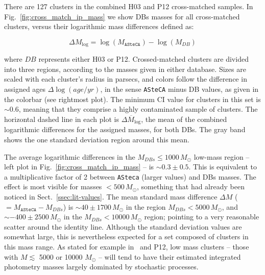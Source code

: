 \documentclass{aa}
\begin{document}
There are 127 clusters in the combined H03 and P12 cross-matched samples.
In Fig.~\ref{fig:cross_match_ip_mass} we show DBs masses for all cross-matched
clusters, versus their logarithmic mass differences defined as:

\begin{equation}
\Delta M_{\log} = \log(M_{\mathtt{ASteCA}}) - \log(M_{DB})
\label{eq:log_mass_diffs}
\end{equation}

\noindent where $DB$ represents either H03 or P12. Crossed-matched clusters are
divided into three regions, according to the masses given in either database.
%
Sizes are scaled with each cluster's radius in parsecs, and colors follow the
difference in assigned ages $\Delta \log(age/yr)$, in the sense \texttt{ASteCA}
minus DB values, as given in the colorbar (see rightmost plot).
The minimum CI value for clusters in this set is ${\sim}0.6$, meaning that they
comprise a highly contaminated sample of clusters.
The horizontal dashed line in each plot is $\overline{\Delta M_{\log}}$, the
mean of the combined logarithmic differences for the assigned masses, for both
DBs. The gray band shows the one standard deviation region around this mean.

The average logarithmic differences in the $M_{DBs}{\le}1000\,M_{\odot}$
low-mass region -- left plot in Fig.~\ref{fig:cross_match_ip_mass} -- is
${\sim}0.3\pm0.5$. This is equivalent to a multiplicative factor of 2 between
\texttt{ASteca} (larger values) and DBs masses. The effect is most visible for
masses ${<}500\,M_{\odot}$, something that had already been noticed in
Sect.~\ref{ssec:lit-values}.
%
The mean standard mass difference $\Delta M$ (${=}M_{\mathtt{ASteCA}}-M_{DBs}$)
is ${\sim}40{\pm}1700\,M_{\odot}$ in the region $M_{DBs} {<}5000\,M_{\odot}$,
and ${\sim-}400{\pm}2500\,M_{\odot}$ in the $M_{DBs} {<}10000\,M_{\odot}$
region; pointing to a very reasonable scatter around the identity line.
%
Although the standard deviation values are somewhat large, this is
nevertheless expected for a set composed of clusters in this mass range.
As stated for example in~\cite{Baumgardt_2013} and P12, low mass clusters
-- those with $M{\lesssim}$ 5000 or 10000 $M_{\odot}$ -- will tend to have
their estimated integrated photometry masses largely dominated by stochastic
processes.
\end{document}
